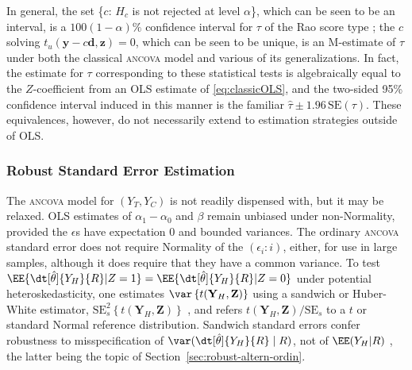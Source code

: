 In general, the set \{$c$:
$H_{c}$ is not rejected at level $\alpha$\}, which can be seen to be an interval, is a
$100(1-\alpha)\%$ confidence interval for $\tau$ of the Rao score type
\citep{agresti2011scoreintervals}; the $c$ solving
$t_{u}(\mathbf{y}-c\mathbf{d}, \mathbf{z}) = 0$, which can be seen to
be unique, is an M-estimate of $\tau$ under both the classical
\textsc{ancova} model and various of its generalizations.
In fact, the estimate for $\tau$ corresponding to these statistical tests is
algebraically equal to the $Z$-coefficient from an OLS estimate of
\eqref{eq:classicOLS}, and the two-sided 95\% confidence interval induced in this
manner is the familiar
$\hat{\tau} \pm 1.96\, \mathrm{SE}(\tau)$.
These equivalences, however, do not necessarily extend to estimation
strategies outside of OLS.

\subsubsection{Robust Standard Error Estimation}\label{sec:sandwich}
The \textsc{ancova} model for $(Y_{T}, Y_{C})$ is not readily dispensed with, but it
may be relaxed.  OLS estimates of $\alpha_1-\alpha_{0}$ and
$\beta$ remain unbiased under non-Normality, provided
the $\epsilon$s have expectation 0 and bounded variances.  The
ordinary \textsc{ancova} standard error does not require Normality of
the $( \epsilon_{i}: i )$, either, for use in large samples, although
it does require that they have a common variance.
To test
$\EE\{ \dt[\hat\theta]{{Y_H}}{ R} | Z=1\} = \EE\{ \dt[\hat\theta]{{Y_H}}{
R} | Z=0\}$
under potential heteroskedasticity, one estimates
$\var\left\{t(\mathbf{Y}_H , \mathbf{Z})\right\}$
using a sandwich or Huber-White estimator,
$\mathrm{SE}_{s}^{2} \left\{ t(\mathbf{Y}_H , \mathbf{Z}) \right\}$
\citep{huber1967behavior,mackinnonWhite1985sandwichHC,longErvin2000sandwichHC,
bellmccaffrey2002sandwichSEs,pustejovskyTipton2017sandwichSEs}, %
and refers $t(\mathbf{Y}_H,\mathbf{Z})/\mathrm{SE}_{s}$
to a $t$ or standard Normal reference distribution.
Sandwich standard errors confer robustness to misspecification of
$\var(\dt[\hat\theta]{Y_{H}}{R}\mid  R)$, not of $\EE(Y_{H}| R)$ \citep{freedman2006sch}, the latter being the topic of
Section~\ref{sec:robust-altern-ordin}.

